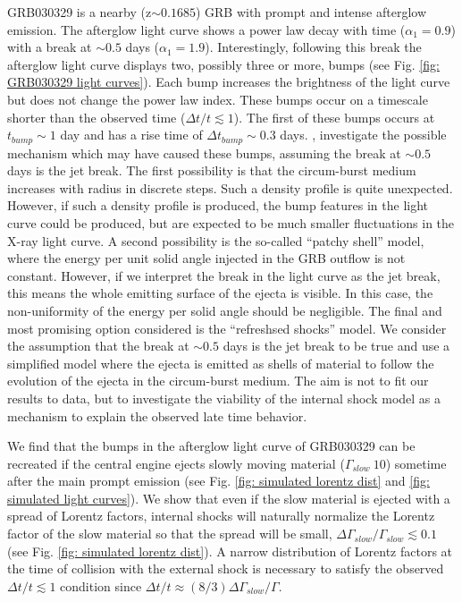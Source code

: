 \documentclass[linenumbers]{aastex631}
\begin{document}
GRB030329 is a nearby (z$\sim 0.1685$) GRB with prompt and intense afterglow emission. The afterglow light curve shows a power law decay with time ($\alpha_1 = 0.9$) with a break at $\sim0.5$ days ($\alpha_1 = 1.9$). Interestingly, following this break the afterglow light curve displays two, possibly three or more, bumps (see Fig. \ref{fig: GRB030329 light curves}). Each bump increases the brightness of the light curve but does not change the power law index. These bumps occur on a timescale shorter than the observed time ($\Delta t / t \lesssim 1$). The first of these bumps occurs at $t_{bump}\sim 1$ day and has a rise time of $\Delta t_{bump}\sim0.3$ days. \citet{2003Natur.426..138G}, investigate the possible mechanism which may have caused these bumps, assuming the break at $\sim 0.5$ days is the jet break. The first possibility is that the circum-burst medium increases with radius in discrete steps. Such a density profile is quite unexpected. However, if such a density profile is produced, the bump features in the light curve could be produced, but are expected to be much smaller fluctuations in the X-ray light curve. A second possibility is the so-called ``patchy shell'' model, where the energy per unit solid angle injected in the GRB outflow is not constant. However, if we interpret the break in the light curve as the jet break, this means the whole emitting surface of the ejecta is visible. In this case, the non-uniformity of the energy per solid angle should be negligible. The final and most promising option considered is the ``refreshsed shocks'' model. We consider the assumption that the break at $\sim 0.5$ days is the jet break to be true and use a simplified model where the ejecta is emitted as shells of material to follow the evolution of the ejecta in the circum-burst medium. The aim is not to fit our results to data, but to investigate the viability of the internal shock model as a mechanism to explain the observed late time behavior.

We find that the bumps in the afterglow light curve of GRB030329 can be recreated if the central engine ejects slowly moving material ($\Gamma_{slow}~10$) sometime after the main prompt emission (see Fig. \ref{fig: simulated lorentz dist} and \ref{fig: simulated light curves}). We show that even if the slow material is ejected with a spread of Lorentz factors, internal shocks will naturally normalize the Lorentz factor of the slow material so that the spread will be small, $\Delta\Gamma_{slow}/\Gamma_{slow}\lesssim0.1$ (see Fig. \ref{fig: simulated lorentz dist}). A narrow distribution of Lorentz factors at the time of collision with the external shock is necessary to satisfy the observed $\Delta t / t \lesssim 1$ condition since $\Delta t / t \approx (8/3) \Delta \Gamma_{slow} / \Gamma$.
\end{document}
